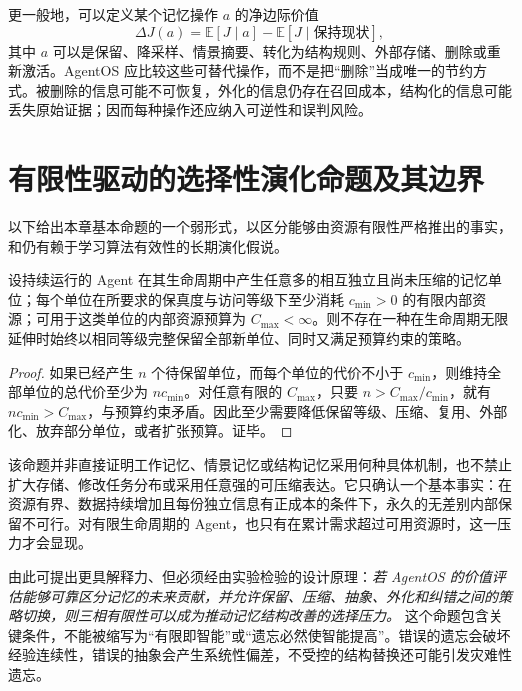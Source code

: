 更一般地，可以定义某个记忆操作 $a$ 的净边际价值
\begin{equation}
\label{eq:delta-value}
 \Delta J(a)=\mathbb E\!\left[J\mid a\right]-\mathbb E\!\left[J\mid \text{保持现状}\right],
\end{equation}
其中 $a$ 可以是保留、降采样、情景摘要、转化为结构规则、外部存储、删除或重新激活。AgentOS 应比较这些可替代操作，而不是把“删除”当成唯一的节约方式。被删除的信息可能不可恢复，外化的信息仍存在召回成本，结构化的信息可能丢失原始证据；因而每种操作还应纳入可逆性和误判风险。

\section{有限性驱动的选择性演化命题及其边界}
\label{sec:selection-proposition}

以下给出本章基本命题的一个弱形式，以区分能够由资源有限性严格推出的事实，和仍有赖于学习算法有效性的长期演化假说。

\begin{proposition}[无差别内部留存不可持续]
\label{prop:no-uniform-retention}
设持续运行的 Agent 在其生命周期中产生任意多的相互独立且尚未压缩的记忆单位；每个单位在所要求的保真度与访问等级下至少消耗 $c_{\min}>0$ 的有限内部资源；可用于这类单位的内部资源预算为 $C_{\max}<\infty$。则不存在一种在生命周期无限延伸时始终以相同等级完整保留全部新单位、同时又满足预算约束的策略。
\end{proposition}
\begin{proof}
如果已经产生 $n$ 个待保留单位，而每个单位的代价不小于 $c_{\min}$，则维持全部单位的总代价至少为 $n c_{\min}$。对任意有限的 $C_{\max}$，只要 $n>C_{\max}/c_{\min}$，就有 $n c_{\min}>C_{\max}$，与预算约束矛盾。因此至少需要降低保留等级、压缩、复用、外部化、放弃部分单位，或者扩张预算。证毕。
\end{proof}

该命题并非直接证明工作记忆、情景记忆或结构记忆采用何种具体机制，也不禁止扩大存储、修改任务分布或采用任意强的可压缩表达。它只确认一个基本事实：在资源有界、数据持续增加且每份独立信息有正成本的条件下，永久的无差别内部保留不可行。对有限生命周期的 Agent，也只有在累计需求超过可用资源时，这一压力才会显现。

由此可提出更具解释力、但必须经由实验检验的设计原理：\emph{若 AgentOS 的价值评估能够可靠区分记忆的未来贡献，并允许保留、压缩、抽象、外化和纠错之间的策略切换，则三相有限性可以成为推动记忆结构改善的选择压力。} 这个命题包含关键条件，不能被缩写为“有限即智能”或“遗忘必然使智能提高”。错误的遗忘会破坏经验连续性，错误的抽象会产生系统性偏差，不受控的结构替换还可能引发灾难性遗忘。

